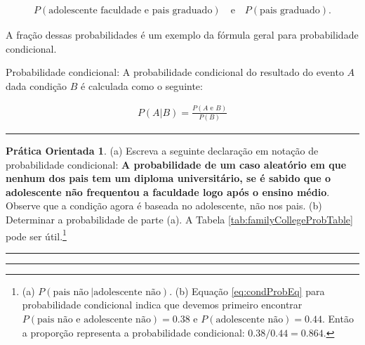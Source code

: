 \documentclass[
]{book}
\theoremstyle{definition}
\theoremstyle{definition}
\theoremstyle{definition}
\newtheorem{exercise}{Prática Orientada}[chapter]
\theoremstyle{definition}
\theoremstyle{remark}
\begin{document}
\begin{align*}
P(\text{adolescente faculdade e pais graduado})
    \quad\text{e}\quad
    P(\text{pais graduado}).
\end{align*}

A fração dessas probabilidades é um exemplo da fórmula geral para probabilidade condicional.

Probabilidade condicional: A probabilidade condicional do resultado do evento \(A\) dada condição \(B\) é calculada como o seguinte:

\begin{align}
P(A | B) = \frac{P(A\text{ e }B)}{P(B)}
\label{eq:condProbEq}
\end{align}

\begin{center}\rule{0.5\linewidth}{0.5pt}\end{center}

\begin{exercise}
\protect\hypertarget{exr:familyCollegeProbOfParentsEqualNotGivenTeen}{}{\label{exr:familyCollegeProbOfParentsEqualNotGivenTeen} }(a) Escreva a seguinte declaração em notação de probabilidade condicional: \textbf{A probabilidade de um caso aleatório em que nenhum dos pais tem um diploma universitário, se é sabido que o adolescente não frequentou a faculdade logo após o ensino médio}. Observe que a condição agora é baseada no adolescente, não nos pais.
(b) Determinar a probabilidade de parte (a). A Tabela \ref{tab:familyCollegeProbTable} pode ser útil.\footnote{(a) \(P(\text{pais não}\ | \text{adolescente não})\). (b) Equação \eqref{eq:condProbEq} para probabilidade condicional indica que devemos primeiro encontrar \(P(\text{pais não e adolescente não}) = 0.38\) e \(P(\text{adolescente não}) = 0.44\). Então a proporção representa a probabilidade condicional: \(0.38 / 0.44 = 0.864\).}
\end{exercise}

\begin{center}\rule{0.5\linewidth}{0.5pt}\end{center}

\begin{center}\rule{0.5\linewidth}{0.5pt}\end{center}
\end{document}
